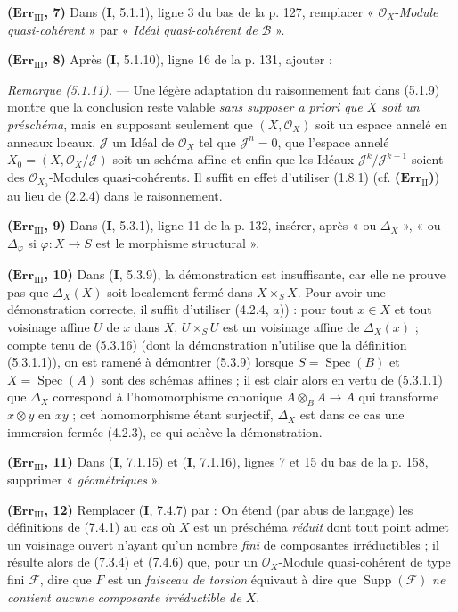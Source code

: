 \noindent\textbf{($\mathbf{Err}_{\mathrm{III}}$, 7)} Dans (\textbf{I}, 5.1.1), ligne 3
du bas de la p. 127, remplacer « $\mathscr O_X$-\emph{Module quasi-cohérent} » par
« \emph{Idéal quasi-cohérent de} $\mathscr B$ ».

\noindent\textbf{($\mathbf{Err}_{\mathrm{III}}$, 8)} Après (\textbf{I}, 5.1.10),
ligne 16 de la p. 131, ajouter :

\emph{Remarque (5.1.11).} --- Une légère adaptation du raisonnement fait dans
(5.1.9) montre que la conclusion reste valable \emph{sans supposer a priori
que $X$ soit un préschéma}, mais
en supposant seulement que $(X,\mathscr O_X)$ soit un espace annelé en anneaux
locaux, $\mathscr J$ un Idéal de $\mathscr O_X$ tel que $\mathscr J^n=0$, que
l'espace annelé $X_0=(X,\mathscr O_X/\mathscr J)$ soit un schéma affine et enfin
que les Idéaux $\mathscr J^k/\mathscr J^{k+1}$ soient des
$\mathscr O_{X_0}$-Modules quasi-cohérents. Il suffit en effet d'utiliser
(1.8.1) (cf. \textbf{($\mathbf{Err}_{\mathrm{II}}$)}) au lieu de (2.2.4) dans le
raisonnement.

\noindent\textbf{($\mathbf{Err}_{\mathrm{III}}$, 9)} Dans (\textbf{I}, 5.3.1), ligne
11 de la p. 132, insérer, après « ou $\Delta_X$ », « ou $\Delta_\varphi$ si
$\varphi:X\to S$ est le morphisme structural ».

\noindent\textbf{($\mathbf{Err}_{\mathrm{III}}$, 10)} Dans (\textbf{I}, 5.3.9), la
démonstration est insuffisante, car elle ne prouve pas que $\Delta_X(X)$ soit
localement fermé dans $X\times_SX$. Pour avoir une démonstration correcte, il
suffit d'utiliser (4.2.4, $a$)) : pour tout $x\in X$ et tout voisinage affine
$U$ de $x$ dans $X$, $U\times_SU$ est un voisinage affine de $\Delta_X(x)$ ;
compte tenu de (5.3.16) (dont la démonstration n'utilise que la définition
(5.3.1.1)), on est ramené à démontrer (5.3.9) lorsque
$S=\operatorname{Spec}(B)$ et $X=\operatorname{Spec}(A)$ sont des schémas
affines ; il est clair alors en vertu de (5.3.1.1) que $\Delta_X$ correspond à
l'homomorphisme canonique $A\otimes_BA\to A$ qui transforme $x\otimes y$ en
$xy$ ; cet homomorphisme étant surjectif, $\Delta_X$ est dans ce cas une
immersion fermée (4.2.3), ce qui achève la démonstration.

\noindent\textbf{($\mathbf{Err}_{\mathrm{III}}$, 11)} Dans (\textbf{I}, 7.1.15) et
(\textbf{I}, 7.1.16), lignes 7 et 15 du bas de la p. 158, supprimer
« \emph{géométriques} ».

\noindent\textbf{($\mathbf{Err}_{\mathrm{III}}$, 12)} Remplacer (\textbf{I}, 7.4.7)
par : On étend (par abus de langage) les définitions de (7.4.1) au cas où
$X$ est un préschéma \emph{réduit} dont tout point admet un voisinage ouvert
n'ayant qu'un nombre \emph{fini} de composantes irréductibles ; il résulte
alors de (7.3.4) et (7.4.6) que, pour un $\mathscr O_X$-Module quasi-cohérent de
type fini $\mathscr F$, dire que $F$ est un \emph{faisceau de torsion}
équivaut à dire que $\operatorname{Supp}(\mathscr F)$ \emph{ne contient aucune
composante irréductible de $X$}.

